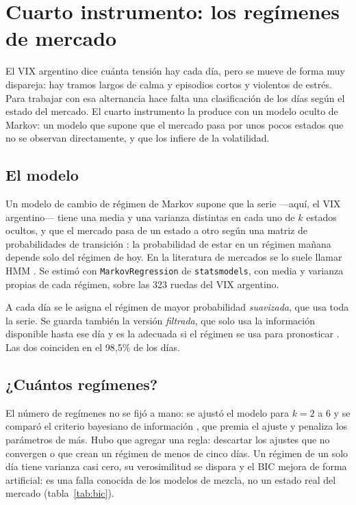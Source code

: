 \chapter{Cuarto instrumento: los regímenes de mercado}
\label{cap:hmm}

El VIX argentino dice cuánta tensión hay cada día, pero se mueve de forma muy dispareja: hay
tramos largos de calma y episodios cortos y violentos de estrés. Para trabajar con esa
alternancia hace falta una clasificación de los días según el estado del mercado. El cuarto
instrumento la produce con un modelo oculto de Markov: un modelo que supone que el mercado
pasa por unos pocos estados que no se observan directamente, y que los infiere de la
volatilidad.

\section{El modelo}

Un modelo de cambio de régimen de Markov supone que la serie —aquí, el VIX argentino— tiene una
media y una varianza distintas en cada uno de $k$ estados ocultos, y que el mercado pasa de un
estado a otro según una matriz de probabilidades de transición
\citep{hamilton1989,kim1994}: la probabilidad de estar en un régimen mañana depende solo del
régimen de hoy. En la literatura de mercados se lo suele llamar HMM \citep{rabiner1989}. Se
estimó con \texttt{MarkovRegression} de \texttt{statsmodels}, con media y varianza propias de
cada régimen, sobre las 323 ruedas del VIX argentino.

A cada día se le asigna el régimen de mayor probabilidad \textit{suavizada}, que usa toda la
serie. Se guarda también la versión \textit{filtrada}, que solo usa la información disponible
hasta ese día y es la adecuada si el régimen se usa para pronosticar \citep{majumder2023}. Las
dos coinciden en el 98,5\% de los días.

\section{¿Cuántos regímenes?}

El número de regímenes no se fijó a mano: se ajustó el modelo para $k=2$ a 6 y se comparó el
criterio bayesiano de información \citep[BIC;][]{schwarz1978}, que premia el ajuste y penaliza
los parámetros de más. Hubo que agregar una regla: descartar los ajustes que no convergen o que
crean un régimen de menos de cinco días. Un régimen de un solo día tiene varianza casi cero, su
verosimilitud se dispara y el BIC mejora de forma artificial: es una falla conocida de los
modelos de mezcla, no un estado real del mercado (tabla~\ref{tab:bic}).

